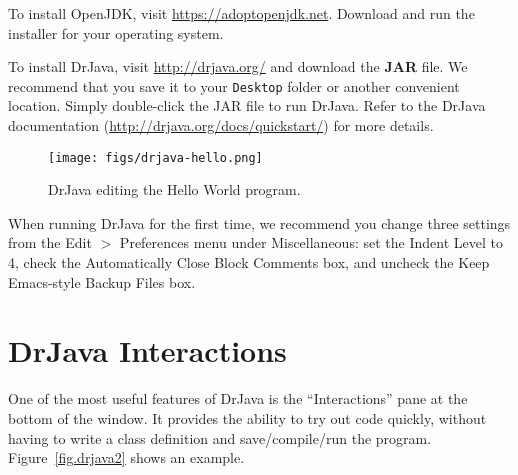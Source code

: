To install OpenJDK, visit \url{https://adoptopenjdk.net}.
Download and run the installer for your operating system.




To install DrJava, visit \url{http://drjava.org/} and download the {\bf JAR} file.
We recommend that you save it to your {\tt Desktop} folder or another convenient location.
Simply double-click the JAR file to run DrJava.
Refer to the DrJava documentation (\url{http://drjava.org/docs/quickstart/}) for more details.

\begin{figure}[!ht]
\begin{center}
\texttt{[image: figs/drjava-hello.png]}
\caption{DrJava editing the Hello World program.}
\label{fig.drjava1}
\end{center}
\end{figure}

When running DrJava for the first time, we recommend you change three settings from the {\sf Edit $>$ Preferences} menu under {\sf Miscellaneous}: set the {\sf Indent Level} to 4, check the {\sf Automatically Close Block Comments} box, and uncheck the {\sf Keep Emacs-style Backup Files} box.




\section{DrJava Interactions}
\label{tools_drjava-interactions}

One of the most useful features of DrJava is the ``Interactions'' pane at the bottom of the window.
It provides the ability to try out code quickly, without having to write a class definition and save/compile/run the program.
Figure~\ref{fig.drjava2} shows an example.


